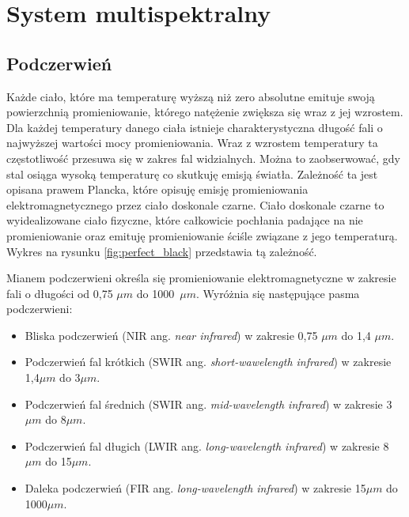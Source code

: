 \chapter{System multispektralny}
\label{cha:multispectral}


 
\section{Podczerwień}

Każde ciało, które ma temperaturę wyższą niż zero absolutne emituje swoją powierzchnią promieniowanie, którego natężenie zwiększa się wraz z jej wzrostem.
Dla każdej temperatury danego ciała istnieje charakterystyczna długość fali o najwyższej wartości mocy promieniowania. Wraz z wzrostem temperatury ta częstotliwość przesuwa się w zakres fal widzialnych. 
Można to zaobserwować, gdy stal osiąga wysoką temperaturę co skutkuję emisją światła. 
Zależność ta jest opisana prawem Plancka, które opisuję emisję promieniowania elektromagnetycznego przez ciało doskonale czarne. 
Ciało doskonale czarne to wyidealizowane ciało fizyczne, które całkowicie pochłania padające na nie promieniowanie oraz emituję promieniowanie ściśle związane z jego temperaturą.
Wykres na rysunku \ref{fig:perfect_black} przedstawia tą zależność. 

Mianem podczerwieni określa się promieniowanie elektromagnetyczne w zakresie fali o długości od 0,75 $\mu m$ do 1000~$\mu m$. Wyróżnia się następujące pasma podczerwieni:
\begin{itemize}
\item Bliska podczerwień (NIR ang. \textit{near infrared}) w zakresie 0,75 $\mu m$ do 1,4 $\mu m$.
\item Podczerwień fal krótkich (SWIR ang. \textit{short-wawelength infrared}) w zakresie 1,4$\mu m$ do 3$\mu m$.
\item Podczerwień fal średnich (SWIR ang. \textit{mid-wavelength infrared}) w zakresie 3$\mu m$ do 8$\mu m$.
\item Podczerwień fal długich (LWIR ang. \textit{long-wavelength infrared}) w zakresie 8$\mu m$ do 15$\mu m$.
\item Daleka podczerwień (FIR ang. \textit{long-wavelength infrared}) w zakresie 15$\mu m$ do 1000$\mu m$.
\end{itemize}

